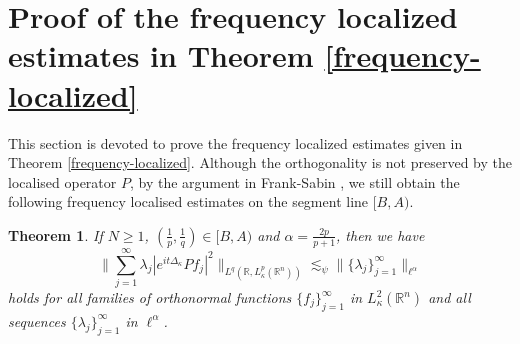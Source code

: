 \documentclass[a4paper,11pt, reqno]{amsart}
\numberwithin{equation}{section}
\theoremstyle{plain}
\newtheorem{theorem}{Theorem}[section]
\theoremstyle{definition}
\theoremstyle{remark}
\begin{document}
\section{Proof of the frequency localized estimates in Theorem \ref{frequency-localized}}\label{sec5}
This section is devoted to prove the frequency localized estimates given in  Theorem \ref{frequency-localized}. Although the orthogonality is not preserved by the localised operator $P$, by the argument in Frank-Sabin \cite{FS}, we still obtain the following frequency localised estimates on the segment line $[B,A)$.
\begin{theorem} \label{adimissible}
If $N\geq 1$, $(\frac{1}{p},\frac{1}{q})\in [B,A)$ and $\alpha=\frac{2p}{p+1}$, then we have
\begin{equation*}
			\bigg\|\sum_{j=1}^\infty \lambda_j|e^{it\Delta_\kappa}Pf_j|^2\bigg\|_{L^q(\mathbb{R}, L_\kappa^p(\mathbb{R}^n))}\lesssim_\psi \|\{\lambda_j\}^\infty_{j=1}\|_{\ell^{\alpha}} 
\end{equation*}	
  holds for all families of orthonormal functions $\{f_j\}_{j=1}^\infty$ in $L_\kappa^2(\mathbb{R}^n)$ and all sequences $\{\lambda_j\}^\infty_{j=1}$ in $\ell^{\alpha}$. 
\end{theorem}
\end{document}
